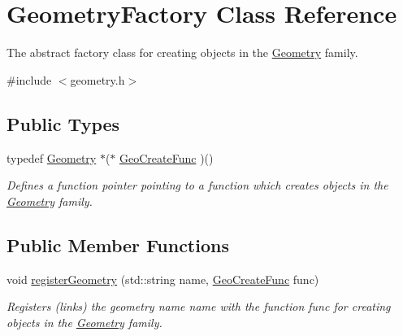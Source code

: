 \hypertarget{classGeometryFactory}{\section{Geometry\-Factory Class Reference}
\label{classGeometryFactory}
}


The abstract factory class for creating objects in the \hyperlink{classGeometry}{Geometry} family.  




{\ttfamily \#include $<$geometry.\-h$>$}

\subsection*{Public Types}
\begin{DoxyCompactItemize}
\item 
\hypertarget{classGeometryFactory_a4ad9d8a8411443e6915d2e0b5f1b0397}{typedef \hyperlink{classGeometry}{Geometry} $\ast$($\ast$ \hyperlink{classGeometryFactory_a4ad9d8a8411443e6915d2e0b5f1b0397}{Geo\-Create\-Func} )()}\label{classGeometryFactory_a4ad9d8a8411443e6915d2e0b5f1b0397}

\begin{DoxyCompactList}\small\item\em Defines a function pointer pointing to a function which creates objects in the \hyperlink{classGeometry}{Geometry} family. \end{DoxyCompactList}\end{DoxyCompactItemize}
\subsection*{Public Member Functions}
\begin{DoxyCompactItemize}
\item 
void \hyperlink{classGeometryFactory_a6f722977cce9ea9a3cb3ef1e469178de}{register\-Geometry} (std\-::string name, \hyperlink{classGeometryFactory_a4ad9d8a8411443e6915d2e0b5f1b0397}{Geo\-Create\-Func} func)
\begin{DoxyCompactList}\small\item\em Registers (links) the geometry name {\itshape name} with the function {\itshape func} for creating objects in the \hyperlink{classGeometry}{Geometry} family. \end{DoxyCompactList}\end{DoxyCompactItemize}
